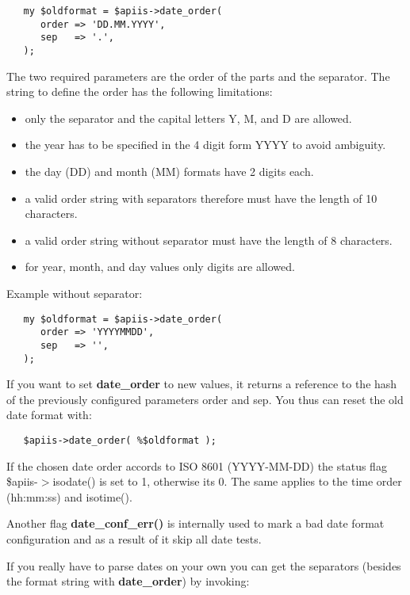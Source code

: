 \begin{verbatim}
   my $oldformat = $apiis->date_order(
      order => 'DD.MM.YYYY',
      sep   => '.',
   );
\end{verbatim}


The two required parameters are the order of the parts and the separator.
The string to define the order has the following limitations:

\begin{itemize}

\item only the separator and the capital letters Y, M, and D are allowed.
\item the year has to be specified in the 4 digit form YYYY to avoid
     ambiguity.
\item the day (DD) and month (MM) formats have 2 digits each.
\item a valid order string with separators therefore must have the length of
     10 characters.
\item a valid order string without separator must have the length of 8
     characters.
\item for year, month, and day values only digits are allowed.\end{itemize}


Example without separator:

\begin{verbatim}
   my $oldformat = $apiis->date_order(
      order => 'YYYYMMDD',
      sep   => '',
   );
\end{verbatim}


If you want to set \textbf{date\_order} to new values, it returns a reference to
the hash of the previously configured parameters order and sep. You thus
can reset the old date format with:

\begin{verbatim}
   $apiis->date_order( %$oldformat );
\end{verbatim}


If the chosen date order accords to ISO 8601 (YYYY-MM-DD) the status flag
\$apiis-$>$isodate() is set to 1, otherwise its 0. The same applies to the
time order (hh:mm:ss) and isotime().



Another flag \textbf{date\_conf\_err()} is internally used to mark a bad date
format configuration and as a result of it skip all date tests.



If you really have to parse dates on your own you can get the separators
(besides the format string with \textbf{date\_order}) by invoking:


